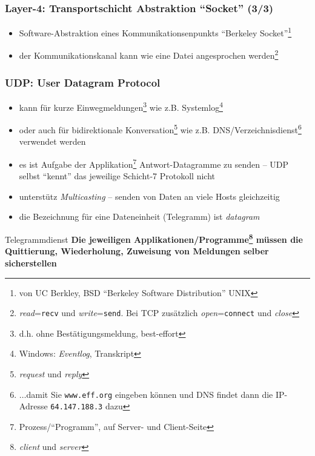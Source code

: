 \documentclass[ignorenonframetext]{beamer}
\begin{document}
\begin{frame}
\frametitle{Layer-4: Transportschicht Abstraktion ``Socket'' (3/3)}
\begin{small}
\begin{itemize}
	\item{Software-Abstraktion eines Kommunikationsenpunkts ``Berkeley Socket''{}\footnote{von UC Berkley, BSD ``Berkeley Software Distribution''
	UNIX}}
	\item{der Kommunikationskanal kann wie eine Datei angesprochen werden\footnote{{\em read}=\texttt{recv} und {\em write}=\texttt{send}. Bei TCP zus\"atzlich {\em open}=\texttt{connect} und {\em close}}}\\
\end{itemize}
\end{small}
	\begin{tiny}\end{tiny}
\end{frame}

\begin{frame}
\end{frame}

\begin{frame}
\frametitle{UDP: User Datagram Protocol}
\begin{itemize}
	\item{kann f\"ur kurze Einwegmeldungen\footnote{d.h. ohne Best\"atigungsmeldung, best-effort} wie z.B. Systemlog\footnote{Windows: {\em Eventlog}, Transkript}}
	\item{oder auch f\"ur bidirektionale Konversation\footnote{{\em request} und {\em reply}} wie z.B. DNS/Verzeichnisdienst\footnote{$\ldots$damit Sie \texttt{www.eff.org} eingeben k\"onnen und DNS findet dann die IP-Adresse \texttt{64.147.188.3} dazu}}
	 verwendet werden
	 \item{es ist Aufgabe der Applikation\footnote{Prozess/``Programm'', auf Server- und Client-Seite} Antwort-Datagramme zu senden -- UDP selbst ``kennt'' das jeweilige Schicht-7 Protokoll nicht}
	 \item{unterst\"utz {\em Multicasting} -- senden von Daten an viele Hosts gleichzeitig}
	 \item{die Bezeichnung f\"ur eine Dateneinheit (Telegramm) ist {\em datagram}}
\end{itemize}
\begin{block}{Telegrammdienst}
\textbf{Die jeweiligen Applikationen/Programme\footnote{{\em client} und {\em server}} m\"ussen die Quittierung, Wiederholung, Zuweisung von Meldungen selber sicherstellen}
\end{block}
\end{frame}
\end{document}
